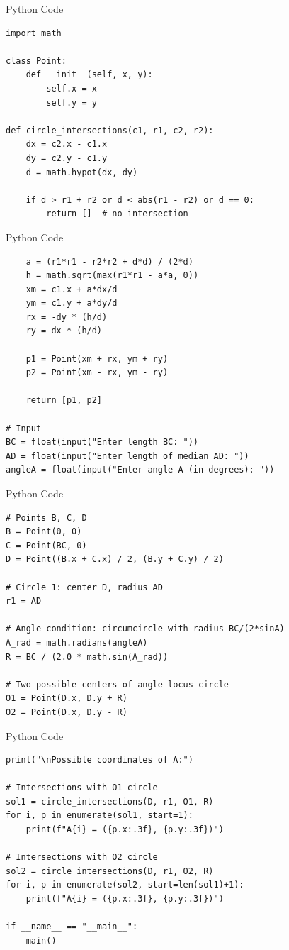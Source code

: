 \documentclass{beamer}
\begin{document}
\begin{frame}[fragile]{Python Code}
    \begin{verbatim}
import math

class Point:
    def __init__(self, x, y):
        self.x = x
        self.y = y

def circle_intersections(c1, r1, c2, r2):
    dx = c2.x - c1.x
    dy = c2.y - c1.y
    d = math.hypot(dx, dy)

    if d > r1 + r2 or d < abs(r1 - r2) or d == 0:
        return []  # no intersection
    \end{verbatim}
\end{frame}

\begin{frame}[fragile]{Python Code}
    \begin{verbatim}
    a = (r1*r1 - r2*r2 + d*d) / (2*d)
    h = math.sqrt(max(r1*r1 - a*a, 0))
    xm = c1.x + a*dx/d
    ym = c1.y + a*dy/d
    rx = -dy * (h/d)
    ry = dx * (h/d)

    p1 = Point(xm + rx, ym + ry)
    p2 = Point(xm - rx, ym - ry)

    return [p1, p2]

# Input
BC = float(input("Enter length BC: "))
AD = float(input("Enter length of median AD: "))
angleA = float(input("Enter angle A (in degrees): "))
    \end{verbatim}
\end{frame}

\begin{frame}[fragile]{Python Code}
    \begin{verbatim}
# Points B, C, D
B = Point(0, 0)
C = Point(BC, 0)
D = Point((B.x + C.x) / 2, (B.y + C.y) / 2)

# Circle 1: center D, radius AD
r1 = AD

# Angle condition: circumcircle with radius BC/(2*sinA)
A_rad = math.radians(angleA)
R = BC / (2.0 * math.sin(A_rad))

# Two possible centers of angle-locus circle
O1 = Point(D.x, D.y + R)
O2 = Point(D.x, D.y - R)
    \end{verbatim}
\end{frame}

\begin{frame}[fragile]{Python Code}
    \begin{verbatim}
print("\nPossible coordinates of A:")

# Intersections with O1 circle
sol1 = circle_intersections(D, r1, O1, R)
for i, p in enumerate(sol1, start=1):
    print(f"A{i} = ({p.x:.3f}, {p.y:.3f})")

# Intersections with O2 circle
sol2 = circle_intersections(D, r1, O2, R)
for i, p in enumerate(sol2, start=len(sol1)+1):
    print(f"A{i} = ({p.x:.3f}, {p.y:.3f})")

if __name__ == "__main__":
    main()
    \end{verbatim}
\end{frame}
\end{document}
